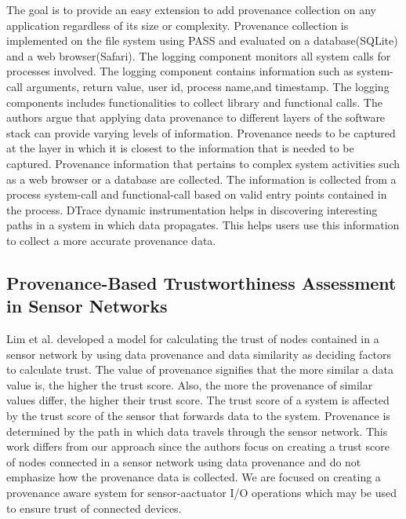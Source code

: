 The goal is to provide an easy extension to add provenance collection on any application regardless of its size or complexity. Provenance collection is implemented on the file system using PASS and evaluated on a database(SQLite) and a web browser(Safari). 
The logging component monitors all system calls for processes involved. The logging component contains information such as system-call arguments, return value, user id, process name,and timestamp. The logging components includes functionalities to collect library and functional calls. The authors argue that applying data provenance to different layers of the software stack can provide varying levels of information. Provenance needs to be captured at the layer in which it is closest to the information that is needed to be captured. Provenance information that pertains to complex system activities such as a web browser or a database are collected. The information is collected from a process system-call and functional-call based on valid entry points contained in the process. DTrace dynamic instrumentation helps in discovering interesting paths in a system in which data propagates. This helps users use this information to collect a more accurate provenance data.


\subsection{Provenance-Based Trustworthiness Assessment in Sensor Networks}
Lim et al. \cite{lim} developed a
model for calculating the trust of nodes contained in a sensor network by using data
provenance and data similarity as deciding factors to calculate trust. The value of
provenance signifies that the more similar a data value is, the higher the trust score.
Also, the more the provenance of similar values differ, the higher their trust score. The trust score of a system is affected by the trust score of the sensor that forwards data to the system. Provenance is determined by the path in which data travels through the sensor network. This work differs from our approach since the authors focus on creating a trust score
of nodes connected in a sensor network using data provenance and do not emphasize
how the provenance data is collected. We are focused on creating a
provenance aware system for sensor-aactuator I/O operations which may be used to ensure trust of
connected devices. 

